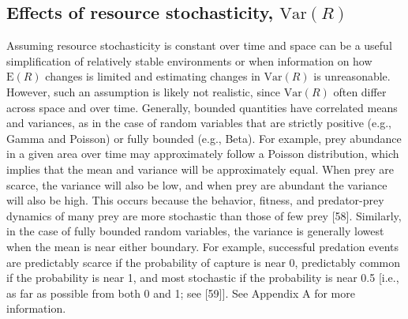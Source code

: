 \documentclass[
  12pt,
]{article}
\begin{document}
\subsection{\texorpdfstring{Effects of resource stochasticity, \(\text{Var}(R)\)}{Effects of resource stochasticity, \textbackslash text\{Var\}(R)}}\label{effects-of-resource-stochasticity-textvarr}

\noindent Assuming resource stochasticity is constant over time and space can be a useful simplification of relatively stable environments or when information on how \(\text{E}(R)\) changes is limited and estimating changes in \(\text{Var}(R)\) is unreasonable. However, such an assumption is likely not realistic, since \(\text{Var}(R)\) often differ across space and over time. Generally, bounded quantities have correlated means and variances, as in the case of random variables that are strictly positive (e.g., Gamma and Poisson) or fully bounded (e.g., Beta). For example, prey abundance in a given area over time may approximately follow a Poisson distribution, which implies that the mean and variance will be approximately equal. When prey are scarce, the variance will also be low, and when prey are abundant the variance will also be high. This occurs because the behavior, fitness, and predator-prey dynamics of many prey are more stochastic than those of few prey {[}58{]}. Similarly, in the case of fully bounded random variables, the variance is generally lowest when the mean is near either boundary. For example, successful predation events are predictably scarce if the probability of capture is near 0, predictably common if the probability is near 1, and most stochastic if the probability is near 0.5 {[}i.e., as far as possible from both 0 and 1; see {[}59{]}{]}. See Appendix A for more information.
\end{document}
